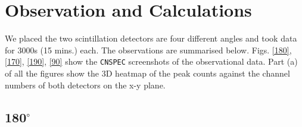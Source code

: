 \section{Observation and Calculations}

We placed the two scintillation detectors are four different angles and took data for 3000s (15 mins.) each. The observations are summarised below. Figs. \ref{180}, \ref{170}, \ref{190}, \ref{90} show the \verb|CNSPEC| screenshots of the observational data. Part (a) of all the figures show the 3D heatmap of the peak counts against the channel numbers of both detectors on the x-y plane. 

\subsection{180$^\circ$}

